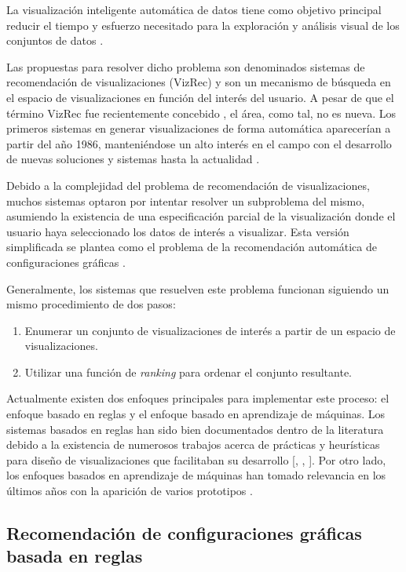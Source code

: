 La visualizaci\'on inteligente autom\'atica de datos tiene como objetivo
principal reducir el tiempo y esfuerzo necesitado para la exploraci\'on y
an\'alisis visual de los conjuntos de datos \cite{zeng2021we}. 

Las propuestas para
resolver dicho problema son denominados sistemas de recomendaci\'on de
visualizaciones (VizRec) y son un mecanismo de b\'usqueda en el espacio de visualizaciones
en funci\'on del inter\'es del usuario. A pesar de que el t\'ermino
VizRec fue recientemente concebido \cite{vartak2017towards}, el \'area, como tal, no es nueva.
Los primeros sistemas en generar visualizaciones de forma autom\'atica aparecer\'ian
a partir del a\~no 1986, manteni\'endose un alto inter\'es en el campo con el desarrollo
de nuevas soluciones y sistemas hasta la actualidad \cite{godfrey2016interactive}. 

Debido a la complejidad del problema de recomendaci\'on de visualizaciones, muchos
sistemas optaron por intentar resolver un subproblema del mismo,
asumiendo la existencia de una especificaci\'on parcial de la visualizaci\'on donde el usuario haya seleccionado
los datos de inter\'es a visualizar. Esta versi\'on simplificada se plantea como el problema de la
recomendaci\'on autom\'atica de configuraciones gr\'aficas \cite{qin2020making}.

Generalmente, los sistemas que resuelven este problema funcionan siguiendo un mismo procedimiento de dos pasos:
\begin{enumerate}
    \item Enumerar un conjunto de visualizaciones de inter\'es a partir de un espacio de visualizaciones.
    \item Utilizar una funci\'on de \textit{ranking} para ordenar el conjunto resultante.
\end{enumerate}

Actualmente existen dos enfoques principales para implementar este proceso: el enfoque basado en reglas
y el enfoque basado en aprendizaje de m\'aquinas. Los sistemas basados en reglas han sido bien documentados dentro de la 
literatura debido a la existencia
de numerosos trabajos acerca de pr\'acticas y heur\'isticas para dise\~no de visualizaciones que facilitaban 
su desarrollo [\cite*{kelleher2011ten}, \cite*{tufte1985visual}, \cite*{tufte1990envisioning}].
Por otro lado, los enfoques basados en aprendizaje de m\'aquinas han tomado relevancia en los \'ultimos a\~nos con la aparici\'on
de varios prototipos \cite{zeng2021we}.

\subsection{Recomendaci\'on de configuraciones gr\'aficas basada en reglas} \label{subsection:rule-viz-rec}

